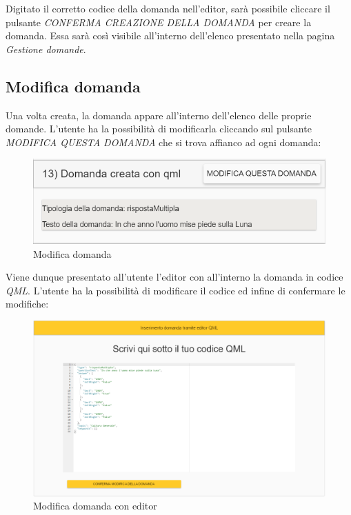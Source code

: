 Digitato il corretto codice della domanda nell'editor, sarà possibile cliccare il pulsante \textit{CONFERMA CREAZIONE DELLA DOMANDA} per creare la domanda. Essa sarà così visibile all'interno dell'elenco presentato nella pagina \textit{Gestione domande}.

\newpage
\subsection{Modifica domanda}
Una volta creata, la domanda appare all'interno dell'elenco delle proprie domande. L'utente ha la possibilità di modificarla cliccando sul pulsante \textit{MODIFICA QUESTA DOMANDA} che si trova affianco ad ogni domanda:

\label{ModificaDomanda}
\begin{figure}[ht]
	\centering
	\includegraphics[scale=0.50]{img/modifica_domanda.png}
	\caption{Modifica domanda}
\end{figure}
\FloatBarrier

Viene dunque presentato all'utente l'editor con all'interno la domanda in codice \textit{QML}. L'utente ha la possibilità di modificare il codice ed infine di confermare le modifiche:

\label{ModificaEditor}
\begin{figure}[ht]
	\centering
	\includegraphics[scale=0.45]{img/modifica_editor.png}
	\caption{Modifica domanda con editor}
\end{figure}
\FloatBarrier 